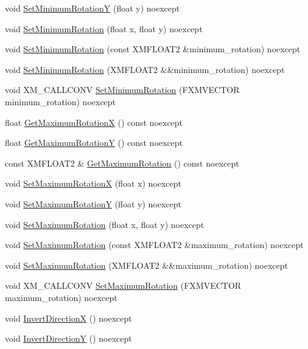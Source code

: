 \begin{DoxyCompactItemize}
\item 
void \hyperlink{classmage_1_1_mouse_look_script_ad010dc4dbec4815e12ae6c0fd919350b}{Set\+Minimum\+RotationY} (float y) noexcept
\item 
void \hyperlink{classmage_1_1_mouse_look_script_a27b21afa03d6c5cba9b206beb1a12533}{Set\+Minimum\+Rotation} (float x, float y) noexcept
\item 
void \hyperlink{classmage_1_1_mouse_look_script_a85eff477d2a3a98330193d466c6e54a0}{Set\+Minimum\+Rotation} (const X\+M\+F\+L\+O\+A\+T2 \&minimum\+\_\+rotation) noexcept
\item 
void \hyperlink{classmage_1_1_mouse_look_script_ac7e0fe75ff9e16b34ba53cb1a96744e9}{Set\+Minimum\+Rotation} (X\+M\+F\+L\+O\+A\+T2 \&\&minimum\+\_\+rotation) noexcept
\item 
void X\+M\+\_\+\+C\+A\+L\+L\+C\+O\+NV \hyperlink{classmage_1_1_mouse_look_script_a5e0c956a28b8c26dfdfcc704301fd0c7}{Set\+Minimum\+Rotation} (F\+X\+M\+V\+E\+C\+T\+OR minimum\+\_\+rotation) noexcept
\item 
float \hyperlink{classmage_1_1_mouse_look_script_ad9ba164d80ed752e64cd7b0275a21460}{Get\+Maximum\+RotationX} () const noexcept
\item 
float \hyperlink{classmage_1_1_mouse_look_script_a9650ed4b2592e89fc8428b3a7dde1029}{Get\+Maximum\+RotationY} () const noexcept
\item 
const X\+M\+F\+L\+O\+A\+T2 \& \hyperlink{classmage_1_1_mouse_look_script_a43d226ce0c1d8232bfe231cbcb20698e}{Get\+Maximum\+Rotation} () const noexcept
\item 
void \hyperlink{classmage_1_1_mouse_look_script_a27362a20031fce6ded6212e68545d8ee}{Set\+Maximum\+RotationX} (float x) noexcept
\item 
void \hyperlink{classmage_1_1_mouse_look_script_a8a48ea338ba2d2da3278b389d6861dfb}{Set\+Maximum\+RotationY} (float y) noexcept
\item 
void \hyperlink{classmage_1_1_mouse_look_script_aeffd8aa88e7ae4741f1610a28d0243c4}{Set\+Maximum\+Rotation} (float x, float y) noexcept
\item 
void \hyperlink{classmage_1_1_mouse_look_script_a38b8cefcfbd263017491f9c29b3fbc3c}{Set\+Maximum\+Rotation} (const X\+M\+F\+L\+O\+A\+T2 \&maximum\+\_\+rotation) noexcept
\item 
void \hyperlink{classmage_1_1_mouse_look_script_a98648bbce4fcaf05c4e831c81a49cef1}{Set\+Maximum\+Rotation} (X\+M\+F\+L\+O\+A\+T2 \&\&maximum\+\_\+rotation) noexcept
\item 
void X\+M\+\_\+\+C\+A\+L\+L\+C\+O\+NV \hyperlink{classmage_1_1_mouse_look_script_a234ef8a9d21255042d3831a804acc374}{Set\+Maximum\+Rotation} (F\+X\+M\+V\+E\+C\+T\+OR maximum\+\_\+rotation) noexcept
\item 
void \hyperlink{classmage_1_1_mouse_look_script_a2f1fa6a912e9ee8720c51d7b03df39a1}{Invert\+DirectionX} () noexcept
\item 
void \hyperlink{classmage_1_1_mouse_look_script_a773f4e2ab6eac735e920db427d82e634}{Invert\+DirectionY} () noexcept
\end{DoxyCompactItemize}
